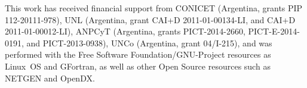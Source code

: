 \documentclass[oneside,onecolumn,10pt,final]{asme2ej}
\begin{document}
\noindent
{}
\noindent
This work has received financial support from
%
%
CONICET (Argentina, grants %
PIP 112-20111-978), %
%
UNL (Argentina, grant %
 CAI+D 2011-01-00134-LI, and %
 CAI+D 2011-01-00012-LI), %
%
ANPCyT (Argentina, grants %
 PICT-2014-2660, %
 PICT-E-2014-0191, and %
 PICT-2013-0938), %
%
%
UNCo (Argentina, grant 04/I-215), %
%
and was performed with the %
{\rm Free Software Foundation/GNU-Project} resources as
Linux~OS and GFortran, %
as well as other Open Source resources such as 
NETGEN and OpenDX. %

%
%



\end{document}
